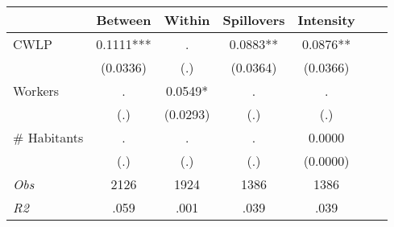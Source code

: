 \begin{tabular}{l*{6}{c}}\hline&\multicolumn{1}{c}{Between}&\multicolumn{1}{c}{Within}&\multicolumn{1}{c}{Spillovers}&\multicolumn{1}{c}{Intensity}\\ \hline 
CWLP & 0.1111*** & . & 0.0883** & 0.0876** \\
 & (0.0336) & (.) & (0.0364) & (0.0366) \\
Workers & . & 0.0549* & . & . \\
 & (.) & (0.0293) & (.) & (.) \\
\# Habitants & . & . & . & 0.0000 \\
  & (.) & (.) & (.) & (0.0000) \\
\hline \textit{Obs} & 2126 & 1924 & 1386 & 1386  \\ \textit{R2} & .059 & .001 & .039 & .039 \\ \hline \end{tabular}

